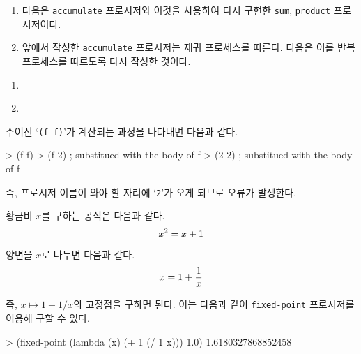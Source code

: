 \begin{enumerate}
\item  다음은 \texttt{accumulate} 프로시저와 이것을 사용하여 다시 구현한
  \texttt{sum}, \texttt{product} 프로시저이다.
\item 앞에서 작성한 \texttt{accumulate} 프로시저는 재귀 프로세스를
  따른다. 다음은 이를 반복 프로세스를 따르도록 다시 작성한 것이다.
\end{enumerate}

\begin{enumerate}
\item \ 
\item \ 
\end{enumerate}


주어진 `\texttt{(f f)}'가 계산되는 과정을 나타내면 다음과 같다.

\begin{scheme}
> (f f)
> (f 2)   ; substitued with the body of f
> (2 2)   ; substitued with the body of f
\end{scheme}

즉, 프로시저 이름이 와야 할 자리에 `\texttt{2}'가 오게 되므로 오류가 발생한다.

황금비 $x$를 구하는 공식은 다음과 같다.
\begin{equation}\notag
  x^2 = x + 1
\end{equation}

양변을 $x$로 나누면 다음과 같다.
\begin{equation}\notag
  x = 1 + \frac{1}{x}
\end{equation}

즉, $x \mapsto 1 + 1/x$의 고정점을 구하면 된다. 이는 다음과 같이
\texttt{fixed-point} 프로시저를 이용해 구할 수 있다.

\begin{scheme}
> (fixed-point (lambda (x) (+ 1 (/ 1 x))) 1.0)
1.6180327868852458
\end{scheme}


